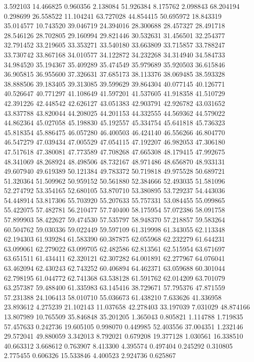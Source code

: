 3.592103
14.466825
0.960356
2.138084
51.926384
8.175762
2.098843
68.204194
0.298699
26.558522
11.104241
63.727028
44.854415
50.695972
18.843319
35.014577
10.743520
39.046719
24.394016
28.300688
28.457327
28.491718
28.546126
28.702805
29.160994
29.821446
30.532631
31.456501
32.254377
32.791452
33.219605
33.353271
33.540180
33.663809
33.715857
33.788247
33.730742
33.867168
34.010577
34.122872
34.232268
34.314940
34.584733
34.984520
35.194367
35.409289
35.474549
35.979689
35.920503
36.615846
36.905815
36.955600
37.326631
37.685173
38.113376
38.069485
38.593328
38.888506
39.183405
39.313085
39.599629
39.864304
40.077145
40.126771
40.526647
40.771297
41.108649
41.597201
41.537605
41.918358
41.510729
42.391226
42.448542
42.626127
43.051383
42.903791
42.926782
43.031652
43.837788
43.820044
44.208025
44.201153
44.332555
44.569362
44.579022
44.862364
45.027058
45.198830
45.192557
45.334754
45.641818
45.736323
45.818354
45.886475
46.057280
46.400503
46.424140
46.556266
46.804770
46.547279
47.039434
47.005529
47.054115
47.192207
46.982053
47.306180
47.517618
47.380081
47.773589
47.708268
47.665308
48.179415
47.992675
48.341069
48.268924
48.498506
48.732167
48.971486
48.656870
48.933131
49.607940
49.619389
50.121384
49.783372
50.719818
49.975528
50.689721
51.320364
51.509962
50.959152
50.561880
52.384666
52.493035
51.581096
52.274792
53.354165
52.680105
53.870710
53.380895
53.729237
54.443036
54.448914
53.817306
55.703920
55.207633
55.757331
53.084455
55.099865
55.422075
57.482781
56.210477
57.740400
58.175954
57.072386
58.091758
57.899903
58.422627
59.474530
57.535797
58.948370
57.218857
59.583264
60.504762
59.030336
59.022449
59.597109
61.319998
61.343055
62.113348
62.194303
61.939284
61.583390
60.387875
62.055968
62.232279
61.644231
63.099061
62.279022
63.099705
62.482586
62.813561
62.515954
63.671697
63.651511
61.434411
62.320121
62.307282
64.001891
62.277967
64.076041
63.462094
62.430243
62.743252
60.406894
64.462371
63.059688
60.301044
62.798195
61.044772
62.741368
63.538128
61.591762
62.014209
63.701079
63.257387
59.488400
61.335983
63.145416
38.729671
57.795376
47.871559
57.231388
24.106413
58.010710
55.036673
61.438210
7.633626
41.336958
23.893612
4.275239
21.102143
11.037658
42.278403
33.197039
7.031029
48.874166
13.807989
10.765509
35.846848
35.201205
1.365043
0.805821
1.114788
1.719835
57.457633
0.242736
19.605105
0.998070
0.449985
52.403556
37.004351
1.232146
29.572041
49.880059
3.342013
8.792021
0.679208
19.377128
1.030561
16.338510
40.663312
3.668612
0.763907
8.413300
4.395574
0.497404
0.245292
0.310805
2.775455
0.606326
15.533846
4.400523
2.924736
0.625867
